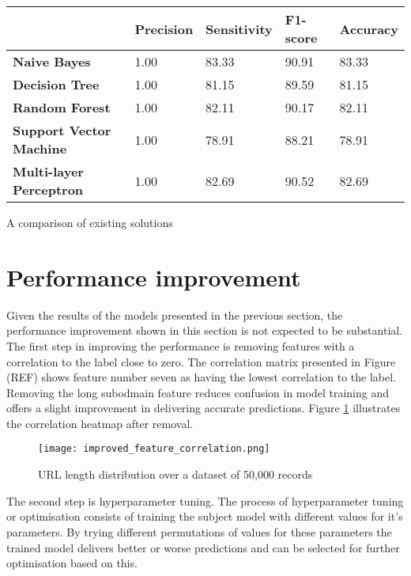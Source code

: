 \begin{singlespace}
	\small
	\begin{center}
		\label{tab:FIRST_TRAINED_MODELS}
		\begin{tabular}{ | m{8em} | m{13em} | m{8.5em} | m{2.3em} | m{5em} | }
			\hline
			                                & \textbf{Precision} &\textbf{Sensitivity} &\textbf{F1-score}& \textbf{Accuracy}  \\
			\hline
			\textbf{Naive Bayes}            & 1.00  & 83.33 & 90.91 &83.33        \\
			\hline
			\textbf{Decision Tree}          & 1.00 & 81.15 & 89.59 & 81.15        \\
			\hline
			\textbf{Random Forest}          & 1.00 & 82.11 & 90.17 & 82.11      \\
			\hline
			\textbf{Support Vector Machine} & 1.00 &78.91&88.21&78.91 \\
			\hline
			\textbf{Multi-layer Perceptron} & 1.00 & 82.69 & 90.52 & 82.69   \\
			\hline
		\end{tabular}
		\captionsetup{type=table}\caption{A comparison of existing solutions \citep{INTELLIGENT_PHISHING_ANFIS}}
	\end{center}
\end{singlespace}


\section{Performance improvement}
Given the results of the models presented in the previous section, the performance improvement shown in this section is not expected to be substantial.
The first step in improving the performance is removing features with a correlation to the label close to zero. The correlation matrix presented in Figure (REF) shows feature number seven as having the lowest correlation to the label. Removing the long subodmain feature reduces confusion in model training and offers a slight improvement in delivering accurate predictions. Figure \ref{fig:IMPROVED_FEATURE_CORRELATION} illustrates the correlation heatmap after removal.

\begin{figure}[t]
	\centering
	\texttt{[image: improved\_feature\_correlation.png]}
	\caption{URL length distribution over a dataset of 50,000 records}
	\label{fig:IMPROVED_FEATURE_CORRELATION}
\end{figure}

The second step is hyperparameter tuning. The process of hyperparameter tuning or optimisation consists of training the subject model with different values for it's parameters. By trying different permutations of values for these parameters the trained model delivers better or worse predictions and can be selected for further optimisation based on this.

